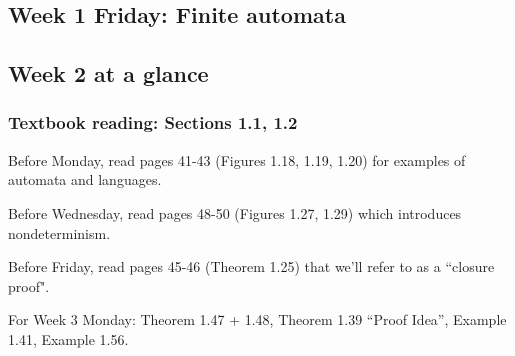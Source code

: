 


\newpage
\subsection*{Week 1 Friday: Finite automata}





\newpage

\subsection*{Week 2 at a glance}

\vspace{-15pt}

\subsubsection*{Textbook reading: Sections 1.1, 1.2}

\vspace{-15pt}

Before Monday, read pages 41-43 (Figures 1.18, 1.19, 1.20) for examples of automata and languages.

Before Wednesday, read pages 48-50 (Figures 1.27, 1.29) which introduces nondeterminism.

Before Friday, read pages 45-46 (Theorem 1.25) that we'll refer to as a ``closure proof".

For Week 3 Monday: Theorem 1.47 + 1.48, Theorem 1.39 ``Proof Idea'', Example 1.41, Example 1.56.

\vspace{-20pt}

